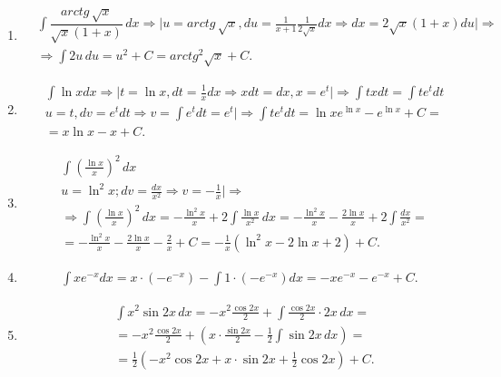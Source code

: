 \documentclass[a4paper, 12pt]{article}
\newcommand{\xint}[1]{\int#1\,dx}
\newcommand{\atg}[1]{arctg\,#1}
\newcommand{\du}{\,du}
\begin{document}
\begin{enumerate}
 \item %
  \begin{align*}
    &\xint{\dfrac{\atg{\sqrt{x}}}{\sqrt{x} (1+x)}} \Rightarrow
    \Big| u = \atg{\sqrt{x}}, du = \frac{1}{x+1}\frac{1}{2\sqrt{x}}dx \Rightarrow
    dx = 2\sqrt{x}(1+x)du \Big| \Rightarrow \\
    &\Rightarrow\int 2u\du = u^2 + C = arctg^2 \sqrt{x} + C
  .\end{align*}
  
  \item %
  \begin{align*}
   &\int{\ln x dx} \Rightarrow
    \Big| t = \ln x, dt = \frac{1}{x} dx \Rightarrow xdt=dx, x = e^t \Big| \Rightarrow
   \int{txdt} = \int{te^tdt} \\
   &u = t, dv =e^tdt \Rightarrow v = \int{e^t dt} = e^t \Big| \Rightarrow
   \int{te^tdt} = \ln x e^{\ln x} - e^{\ln x} + C = \\
   &= x \ln x - x + C
  .\end{align*}
  
  
  \item %
  \begin{align*}
    &\int \left(\frac{\ln x}{x}\right)^2\,dx \\
    &u = \ln^2 x; dv = \frac{dx}{x^2} \Rightarrow v = -\frac{1}{x} \Big| \Rightarrow \\
    &\Rightarrow\int \left(\frac{\ln x}{x}\right)^2\,dx = -\frac{\ln^2 x}{x} + 2\int \frac{\ln x}{x^2}\,dx = -\frac{\ln^2 x}{x} - \frac{2\ln x}{x} + 2\int \frac{dx}{x^2} =\\
    &= -\frac{\ln^2 x}{x} - \frac{2\ln x}{x} - \frac{2}{x} + C=-\frac{1}{x}\left(\ln^2x-2\ln x+2\right) +C
  .\end{align*}
  
  \item %
  \begin{align*}
    \int{xe^{-x}}dx = x \cdot (-e^{-x}) - \int{1 \cdot (-e^{-x})dx} = -xe^{-x} - e^{-x} + C
  .\end{align*}
  
  
  \item %
  \begin{align*}
  &\xint{x^2 \sin{2x}} 
  = - x^2 \frac{\cos{2x}}{2} + \xint{\frac{\cos{2x}}{2}\cdot 2x} = \\
  &=- x^2 \frac{\cos{2x}}{2} + (x\cdot \frac{\sin{2x}}{2} - \frac{1}{2}\xint{\sin{2x}}) = \\
  &= \frac{1}{2}(-x^2 \cos{2x} + x\cdot \sin{2x} + \frac{1}{2}\cos{2x}) + C
  .\end{align*}
  

\end{enumerate}
\end{document}
